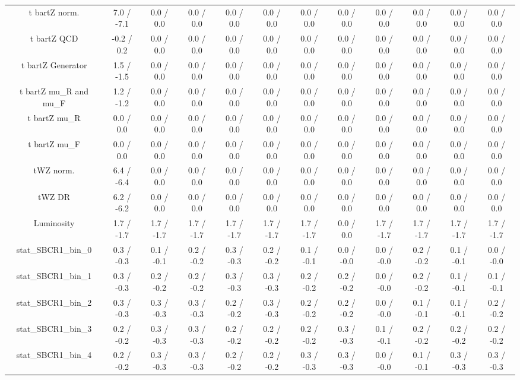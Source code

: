 \begin{table}[htbp]
\begin{center}
\begin{tabular}{|c|c|c|c|c|c|c|c|c|c|c|c|}
  t bar{t}Z norm. & 7.0 / -7.1 & 0.0 / 0.0 & 0.0 / 0.0 & 0.0 / 0.0 & 0.0 / 0.0 & 0.0 / 0.0 & 0.0 / 0.0 & 0.0 / 0.0 & 0.0 / 0.0 & 0.0 / 0.0 & 0.0 / 0.0 \\ 
  t bar{t}Z QCD & -0.2 / 0.2 & 0.0 / 0.0 & 0.0 / 0.0 & 0.0 / 0.0 & 0.0 / 0.0 & 0.0 / 0.0 & 0.0 / 0.0 & 0.0 / 0.0 & 0.0 / 0.0 & 0.0 / 0.0 & 0.0 / 0.0 \\ 
  t bar{t}Z Generator & 1.5 / -1.5 & 0.0 / 0.0 & 0.0 / 0.0 & 0.0 / 0.0 & 0.0 / 0.0 & 0.0 / 0.0 & 0.0 / 0.0 & 0.0 / 0.0 & 0.0 / 0.0 & 0.0 / 0.0 & 0.0 / 0.0 \\ 
  t bar{t}Z  mu_{R} and  mu_{F} & 1.2 / -1.2 & 0.0 / 0.0 & 0.0 / 0.0 & 0.0 / 0.0 & 0.0 / 0.0 & 0.0 / 0.0 & 0.0 / 0.0 & 0.0 / 0.0 & 0.0 / 0.0 & 0.0 / 0.0 & 0.0 / 0.0 \\ 
  t bar{t}Z  mu_{R} & 0.0 / 0.0 & 0.0 / 0.0 & 0.0 / 0.0 & 0.0 / 0.0 & 0.0 / 0.0 & 0.0 / 0.0 & 0.0 / 0.0 & 0.0 / 0.0 & 0.0 / 0.0 & 0.0 / 0.0 & 0.0 / 0.0 \\ 
  t bar{t}Z  mu_{F} & 0.0 / 0.0 & 0.0 / 0.0 & 0.0 / 0.0 & 0.0 / 0.0 & 0.0 / 0.0 & 0.0 / 0.0 & 0.0 / 0.0 & 0.0 / 0.0 & 0.0 / 0.0 & 0.0 / 0.0 & 0.0 / 0.0 \\ 
  tWZ norm. & 6.4 / -6.4 & 0.0 / 0.0 & 0.0 / 0.0 & 0.0 / 0.0 & 0.0 / 0.0 & 0.0 / 0.0 & 0.0 / 0.0 & 0.0 / 0.0 & 0.0 / 0.0 & 0.0 / 0.0 & 0.0 / 0.0 \\ 
  tWZ DR & 6.2 / -6.2 & 0.0 / 0.0 & 0.0 / 0.0 & 0.0 / 0.0 & 0.0 / 0.0 & 0.0 / 0.0 & 0.0 / 0.0 & 0.0 / 0.0 & 0.0 / 0.0 & 0.0 / 0.0 & 0.0 / 0.0 \\ 
  Luminosity & 1.7 / -1.7 & 1.7 / -1.7 & 1.7 / -1.7 & 1.7 / -1.7 & 1.7 / -1.7 & 1.7 / -1.7 & 0.0 / 0.0 & 1.7 / -1.7 & 1.7 / -1.7 & 1.7 / -1.7 & 1.7 / -1.7 \\ 
 stat_SBCR1_bin_0 & 0.3 / -0.3 & 0.1 / -0.1 & 0.2 / -0.2 & 0.3 / -0.3 & 0.2 / -0.2 & 0.1 / -0.1 & 0.0 / -0.0 & 0.0 / -0.0 & 0.2 / -0.2 & 0.1 / -0.1 & 0.0 / -0.0 \\ 
 stat_SBCR1_bin_1 & 0.3 / -0.3 & 0.2 / -0.2 & 0.2 / -0.2 & 0.3 / -0.3 & 0.3 / -0.3 & 0.2 / -0.2 & 0.2 / -0.2 & 0.0 / -0.0 & 0.2 / -0.2 & 0.1 / -0.1 & 0.1 / -0.1 \\ 
 stat_SBCR1_bin_2 & 0.3 / -0.3 & 0.3 / -0.3 & 0.3 / -0.3 & 0.2 / -0.2 & 0.3 / -0.3 & 0.2 / -0.2 & 0.2 / -0.2 & 0.0 / -0.0 & 0.1 / -0.1 & 0.1 / -0.1 & 0.2 / -0.2 \\ 
 stat_SBCR1_bin_3 & 0.2 / -0.2 & 0.3 / -0.3 & 0.3 / -0.3 & 0.2 / -0.2 & 0.2 / -0.2 & 0.2 / -0.2 & 0.3 / -0.3 & 0.1 / -0.1 & 0.2 / -0.2 & 0.2 / -0.2 & 0.2 / -0.2 \\ 
 stat_SBCR1_bin_4 & 0.2 / -0.2 & 0.3 / -0.3 & 0.3 / -0.3 & 0.2 / -0.2 & 0.2 / -0.2 & 0.3 / -0.3 & 0.3 / -0.3 & 0.0 / -0.0 & 0.1 / -0.1 & 0.3 / -0.3 & 0.3 / -0.3 \\ 

\end{tabular}
\end{center}
\end{table}
